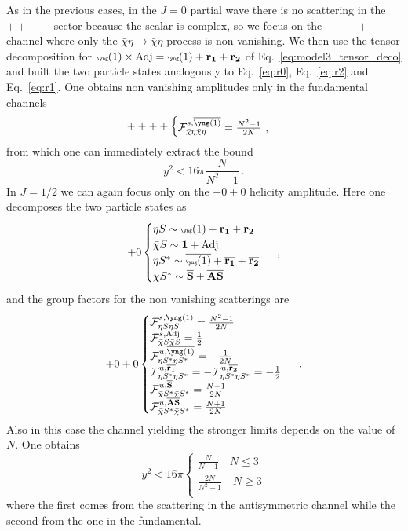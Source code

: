 \documentclass[a4paper,11pt]{article}
\newcommand{\be}{\begin{equation}}
\newcommand{\ee}{\end{equation}}
\newcommand{\nn}{\nonumber}
\begin{document}
As in the previous cases, in the $J=0$ partial wave 
there is no scattering in the $++--$ sector because the scalar is complex, so we focus on the $++++$ channel where only the $\bar \chi \eta \to \bar\chi \eta$ process is non vanishing. We then use the tensor decomposition for ${\tiny{\yng(1)}} \times {\rm Adj} = {\tiny{\yng(1)}} + {\bf r_1}+{\bf r_2}$ of Eq.~\eqref{eq:model3_tensor_deco} and built the two particle states analogously to Eq.~\eqref{eq:r0}, Eq.~\eqref{eq:r2} and Eq.~\eqref{eq:r1}. One obtains non vanishing amplitudes only in the fundamental channels
\begin{align}++++
\begin{cases}
{\cal F}^{s,{\overline{{\tiny{\yng(1)}}}} }_{\bar \chi \eta \bar \chi \eta} =  \frac{N^2-1}{2N} \ ,
\end{cases}
\end{align}
from which one can immediately extract the bound
\be
y^2 < 16\pi\frac{N}{N^2-1} \ .
\ee
In $J=1/2$ we can again focus only on the $+0+0$ helicity amplitude. Here one decomposes the two particle states as
 \be
+0
\begin{cases}
\eta S  \sim  {\tiny{\yng(1)}}+ {\bf r_1} + {\bf r_2}\nn \\
\bar\chi S \sim {\bf 1} + {\rm Adj} \\
\eta S^* \sim \overline{{\tiny{\yng(1)}}} + \overline{{\bf r_1}} + \overline{{\bf r_2}} \\
\bar \chi S^* \sim  {\overline{{\mathbf S}}} + {\overline{{\mathbf{AS}}}}
\end{cases} \ ,
\ee
and the group factors for the non vanishing scatterings are
\begin{align}+0+0
\begin{cases}
{\cal F}^{s,{{\tiny{\yng(1)}}} }_{\eta S\eta S} =  \frac{N^2-1}{2N} \\ 
%
{\cal F}^{s,{\rm Adj}}_{\bar\chi S\bar\chi S} =  \frac{1}{2} \\
%
{\cal F}^{u,{{\overline{{\tiny{\yng(1)}}}}} }_{\eta S^*\eta S^*} = - \frac{1}{2N} \\ 
%
{\cal F}^{u,{\overline{{\bf{r_1}}}} }_{\eta S^*\eta S^*} = -{\cal F}^{u,{\overline{{\bf{r_2}}}} }_{\eta S^*\eta S^*}  = - \frac{1}{2} \\ 
%
{\cal F}^{u,{\overline{{\bf{S}}}} }_{\bar\chi S^*\bar\chi S^*}   = \frac{N-1}{2N}\\
%
{\cal F}^{u,{\overline{{\bf{AS}}}} }_{\bar\chi S^*\bar\chi S^*}   = \frac{N+1}{2N}\end{cases} \ .
\end{align}
Also in this case the channel yielding the stronger limits depends on the value of $N$. One obtains
\be
y^2 < 16 \pi 
\begin{cases}
\frac{N}{N+1} \quad N \le 3\\
\frac{2N}{N^2-1} \quad  N \ge 3\\
\end{cases}
\ee
where the first comes from the scattering in the antisymmetric channel while the second from the one in the fundamental.
\end{document}
